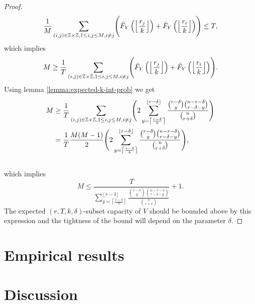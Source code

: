\begin{proof}
\begin{equation*}
      \frac{1}{M} \sum_{(i,j) \in \mathbb{Z}\times\mathbb{Z}, 1 \le i,j \le M, i \ne j}  \Biggl( \bar{F}_Y\left(\left\lfloor \frac{r_j}{k} \right\rfloor\right) + \bar{F}_Y\left(\left\lfloor \frac{r_i}{k} \right\rfloor\right) \Biggr)  \le T,
\end{equation*}
\noindent which implies
\begin{equation}
\label{equ:cap-r}      
       M \geq \frac{1}{T}\sum_{(i,j) \in \mathbb{Z}\times\mathbb{Z}, 1 \le i,j \le M, i \ne j}  \Biggl( \bar{F}_Y\left(\left\lfloor \frac{r_j}{k} \right\rfloor\right) + \bar{F}_Y\left(\left\lfloor \frac{r_i}{k} \right\rfloor\right)\Biggr). 
\end{equation}
Using lemma \ref{lemma:expected-k-int-prob} we get
\begin{equation}
\label{equ:cap-r-2}
    \begin{split}
           M &\ge
           \frac{1}{T}\sum_{(i,j) \in \mathbb{Z}\times\mathbb{Z}, 1 \le i,j \le M, i \ne j}  \Biggl( 2 \sum_{y = \left\lceil \frac{r-\delta}{k} \right\rceil}^{\left\lfloor r - \delta \right\rfloor} \frac{\binom{r-\delta}{y} \binom{n-r-\delta}{r-\delta-y}}{\binom{n}{r+\delta}}\Biggr) \\
           &=\frac{1}{T} \frac{M(M-1)}{2} \Biggl( 2 \sum_{y = \left\lceil \frac{r-\delta}{k} \right\rceil}^{\left\lfloor r - \delta \right\rfloor} \frac{\binom{r-\delta}{y} \binom{n-r-\delta}{r-\delta-y}}{\binom{n}{r+\delta}}\Biggr),
    \end{split}
    \end{equation} \\
\noindent which implies 
\begin{equation}
    \label{equ:cap-r-bounded}     
    M \le \frac{T}{\sum_{y = \left\lceil \frac{r-\delta}{k} \right\rceil}^{\left\lfloor r - \delta \right\rfloor} \frac{\binom{r-\delta}{y} \binom{n-r-\delta}{r-\delta-y}}{\binom{n}{r+\delta}}} + 1.
\end{equation}
The expected $(r,T,k,\delta)$-subset capacity of $V$ should be bounded above by this expression and the tightness of the bound will depend on the parameter $\delta$. 
\end{proof}

\section{Empirical results}


\section{Discussion}














